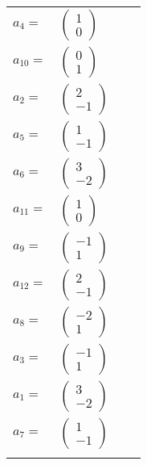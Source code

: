 \documentclass[1p]{elsarticle_modified}
\theoremstyle{definition}
\begin{document}
\begin{tabular}{m{7pt} m{180pt} m{7pt} m{180pt} }
\flushright $a_{4}=$&$\begin{pmatrix}1\\0\end{pmatrix}$ \\
\flushright $a_{10}=$&$\begin{pmatrix}0\\1\end{pmatrix}$ \\
\flushright $a_{2}=$&$\begin{pmatrix}2\\-1\end{pmatrix}$ \\
\flushright $a_{5}=$&$\begin{pmatrix}1\\-1\end{pmatrix}$ \\
\flushright $a_{6}=$&$\begin{pmatrix}3\\-2\end{pmatrix}$ \\
\flushright $a_{11}=$&$\begin{pmatrix}1\\0\end{pmatrix}$ \\
\flushright $a_{9}=$&$\begin{pmatrix}-1\\1\end{pmatrix}$ \\
\flushright $a_{12}=$&$\begin{pmatrix}2\\-1\end{pmatrix}$ \\
\flushright $a_{8}=$&$\begin{pmatrix}-2\\1\end{pmatrix}$ \\
\flushright $a_{3}=$&$\begin{pmatrix}-1\\1\end{pmatrix}$ \\
\flushright $a_{1}=$&$\begin{pmatrix}3\\-2\end{pmatrix}$ \\
\flushright $a_{7}=$&$\begin{pmatrix}1\\-1\end{pmatrix}$\\&\end{tabular}
\end{document}
